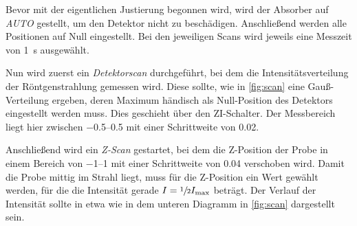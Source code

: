 Bevor mit der eigentlichen Justierung begonnen wird,
wird der Absorber auf \emph{AUTO} gestellt,
um den Detektor nicht zu beschädigen.
Anschließend werden alle Positionen auf Null eingestellt.
Bei den jeweiligen Scans wird jeweils eine Messzeit von \SI{1}{\second} ausgewählt.

Nun wird zuerst ein \emph{Detektorscan} durchgeführt,
bei dem die Intensitätsverteilung der Röntgenstrahlung gemessen wird.
Diese sollte,
wie in \autoref{fig:scan} eine Gauß-Verteilung ergeben,
deren Maximum händisch als Null-Position des Detektors eingestellt werden muss.
Dies geschieht über den ZI-Schalter.
Der Messbereich liegt hier zwischen \numrange{-0.5}{0.5} mit einer Schrittweite von \num{0.02}.

Anschließend wird ein \emph{Z-Scan} gestartet,
bei dem die Z-Position der Probe in einem Bereich von \numrange{-1}{1} mit einer Schrittweite von \num{0.04} verschoben wird.
Damit die Probe mittig im Strahl liegt,
muss für die Z-Position ein Wert gewählt werden,
für die die Intensität gerade $I = \sfrac{1}{2} I_\text{max}$ beträgt.
Der Verlauf der Intensität sollte in etwa wie in dem unteren Diagramm in \autoref{fig:scan} dargestellt sein.
